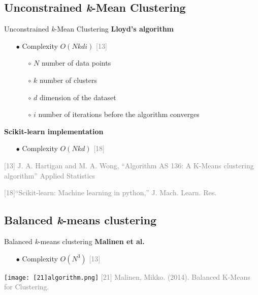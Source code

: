 \subsection{Unconstrained \textit{k}-Mean Clustering}
	\begin{frame}{Unconstrained \textit{k}-Mean Clustering}
		\textbf{Lloyd’s algorithm}
		\begin{itemize}
			\item[$\bullet$] Complexity $O(Nkdi)$ \textcolor{gray}{[13]}
			\begin{itemize}
				\item[$\circ$] $N$ number of data points
				\item[$\circ$] $k$ number of clusters 
				\item[$\circ$] $d$ dimension of the dataset
				\item[$\circ$] $i$ number of iterations before the algorithm converges
			\end{itemize} 
		\end{itemize}
		\textbf{Scikit-learn implementation}
		\begin{itemize}
			\item[$\bullet$] Complexity $O(Nkd)$ \textcolor{gray}{[18]}
		\end{itemize}
		\tiny{ %
			\textcolor{gray}{
				\begin{minipage}{0.5\textwidth} %
					[13] J. A. Hartigan and M. A. Wong, “Algorithm AS 136: A K-Means clustering algorithm” Applied Statistics
				\end{minipage}\hfill
				\begin{minipage}{0.5\textwidth} 
					[18]“Scikit-learn: Machine learning in python,” J. Mach. Learn. Res.
				\end{minipage}\hfill
			}
		}
	\end{frame}
	



\subsection{Balanced \textit{k}-means clustering}
	\begin{frame}{Balanced \textit{k}-means clustering}
		\textbf{Malinen et al.}
		\begin{itemize}
			\item[$\bullet$] Complexity $O(N^3)$ \textcolor{gray}{[13]}
		\end{itemize}
		\texttt{[image: [21]algorithm.png]}
		\tiny{ %
			\textcolor{gray}{
				[21] Malinen, Mikko. (2014). Balanced K-Means for Clustering. 
			}
		}
	\end{frame}

